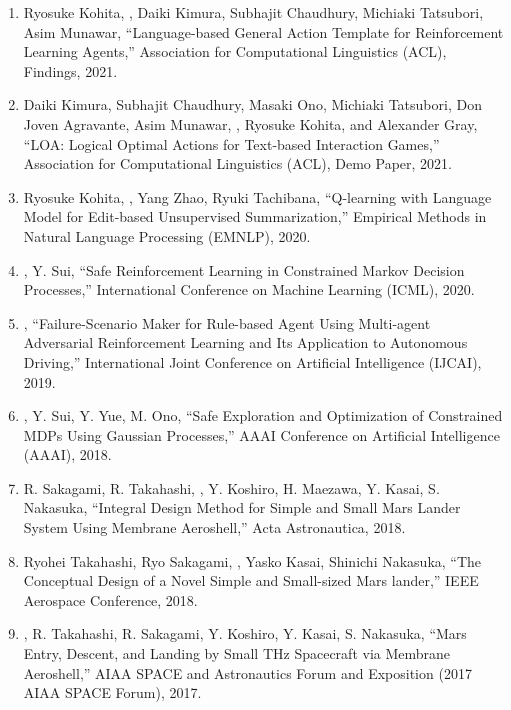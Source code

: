 \begin{enumerate}[leftmargin=*,itemsep=0.35em]
\item 
Ryosuke Kohita, \aw, Daiki Kimura, Subhajit Chaudhury, Michiaki Tatsubori, Asim Munawar,
``Language-based General Action Template for Reinforcement Learning Agents,''
Association for Computational Linguistics (ACL), Findings, 2021.

\item
Daiki Kimura, Subhajit Chaudhury, Masaki Ono, Michiaki Tatsubori, Don Joven Agravante, Asim Munawar, \aw, Ryosuke Kohita, and Alexander Gray,
``LOA: Logical Optimal Actions for Text-based Interaction Games,''
Association for Computational Linguistics (ACL), Demo Paper, 2021.

\item
Ryosuke Kohita, \aw, Yang Zhao, Ryuki Tachibana,
``Q-learning with Language Model for Edit-based Unsupervised Summarization,''
Empirical Methods in Natural Language Processing (EMNLP), 2020.

\item
\aw, Y. Sui,
``Safe Reinforcement Learning in Constrained Markov Decision Processes,''
International Conference on Machine Learning (ICML), 2020.

\item
\aw,
``Failure-Scenario Maker for Rule-based Agent Using Multi-agent Adversarial Reinforcement Learning and Its Application to Autonomous Driving,''
International Joint Conference on Artificial Intelligence (IJCAI), 2019.


\item
\aw, Y. Sui, Y. Yue, M. Ono,
``Safe Exploration and Optimization of Constrained MDPs Using Gaussian Processes,''
AAAI Conference on Artificial Intelligence (AAAI), 2018.


\item
R. Sakagami, R. Takahashi, \aw, Y. Koshiro, H. Maezawa, Y. Kasai, S. Nakasuka,
``Integral Design Method for Simple and Small Mars Lander System Using Membrane Aeroshell,''
Acta Astronautica, 2018.
\item
Ryohei Takahashi, Ryo Sakagami, \aw, Yasko Kasai, Shinichi Nakasuka,
``The Conceptual Design of a Novel Simple and Small-sized Mars lander,''
IEEE Aerospace Conference, 2018.

\item
\aw, R. Takahashi, R. Sakagami, Y. Koshiro, Y. Kasai, S. Nakasuka,
``Mars Entry, Descent, and Landing by Small THz Spacecraft via Membrane Aeroshell,''
AIAA SPACE and Astronautics Forum and Exposition (2017 AIAA SPACE Forum), 2017.


\end{enumerate}
